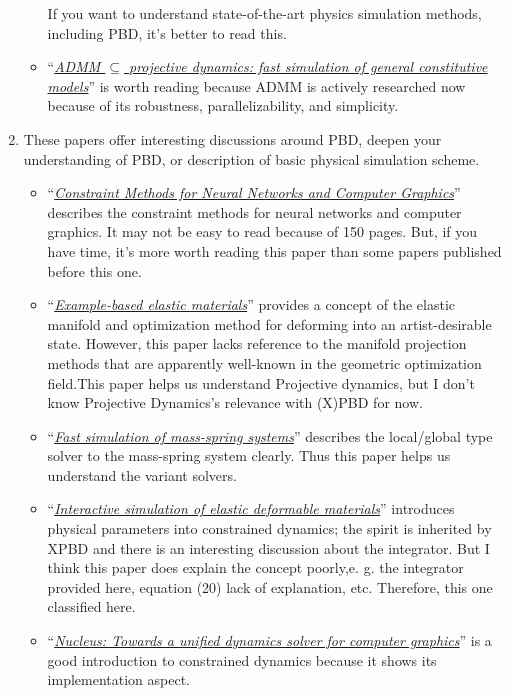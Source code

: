 \documentclass[pdflatex,sn-mathphys-num]{sn-jnl}%
\theoremstyle{thmstyleone}%
\theoremstyle{thmstyletwo}%
\theoremstyle{thmstylethree}%
\newcommand{\pname}[1]{``{\uline{\sl {#1}}}''}
\begin{document}
\begin{enumerate}
\begin{itemize}
			If you want to understand state-of-the-art physics simulation methods, including PBD, it's better to read this.
			\newline
			\item \pname{ADMM $\subseteq$ projective dynamics: fast simulation of general constitutive models}\cite{ADMM_Proj} is worth reading because ADMM is actively researched now because of its robustness, parallelizability, and simplicity. 
		\end{itemize}
		\item These papers offer interesting discussions around PBD, deepen your understanding of PBD, or description of basic physical simulation scheme.
		\begin{itemize}
			\item \pname{Constraint Methods for Neural Networks and Computer Graphics}\cite{ConstrainedPlatt} describes the constraint methods for neural networks and computer graphics.
			It may not be easy to read because of 150 pages. But, if you have time, it's more worth reading this paper than some papers published before this one.
			\newline
			\item \pname{Example-based elastic materials}\cite{Example-basedMartin} provides a concept of the elastic manifold and optimization method for deforming into an artist-desirable state. However, this paper lacks reference to the manifold projection methods that are apparently well-known in the geometric optimization field.This paper helps us understand Projective dynamics, but I don't know Projective Dynamics's relevance with (X)PBD for now.
			\newline
			\item \pname{Fast simulation of mass-spring systems}\cite{fastMassTiantian} describes the local/global type solver to the mass-spring system clearly. Thus this paper helps us understand the variant solvers.
			\newline
			\item \pname{Interactive simulation of elastic deformable materials}\cite{Servin2006InteractiveSO} introduces physical parameters into constrained dynamics; the spirit is inherited by XPBD and there is an interesting discussion about the integrator. But I think this paper does explain the concept poorly,e. g. the integrator provided here, equation (20) lack of explanation, etc. 
			Therefore, this one classified here.
			\newline
			\item \pname{Nucleus: Towards a unified dynamics solver for computer graphics}\cite{Nucleus} is a good introduction to constrained dynamics because it shows its implementation aspect.

\end{itemize}
\end{enumerate}
\end{document}
